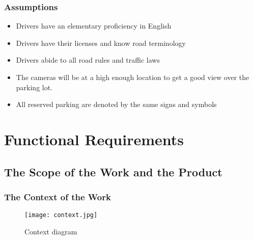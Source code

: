 \documentclass[12pt,letterpaper]{article}
\begin{document}
\subsubsection{Assumptions}
\begin{itemize}
    \item Drivers have an elementary proficiency in English
    \item Drivers have their licenses and know road terminology
    \item Drivers abide to all road rules and traffic laws
    \item The cameras will be at a high enough location to get a good view over the parking lot.
    \item All reserved parking are denoted by the same signs and symbols
\end{itemize}

\newpage
\section{Functional Requirements}

\subsection{The Scope of the Work and the Product}
\subsubsection{The Context of the Work}
\begin{figure}[ht]
    \texttt{[image: context.jpg]}
    \caption{Context diagram}
\end{figure}

\newpage
\clearpage
\end{document}
